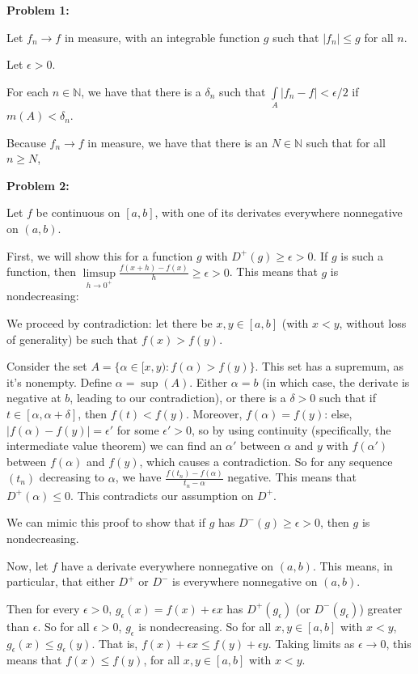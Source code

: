 \documentclass[a4paper,12pt]{article}
\newcommand{\tab}{\hspace{4mm}} %
\newcommand{\shunt}{\vspace{20mm}}
\newcommand{\absval}[1]{\left\lvert #1 \right\rvert}
\newcommand{\al}{\alpha} %
\newcommand{\de}{\delta}
\newcommand{\ep}{\epsilon}
\newcommand{\N}{\mathbb{N}}
\begin{document}
{\bf Problem 1:} 

Let $f_n \to f$ in measure, with an integrable function $g$ such that $\absval{f_n} \leq g$ for all $n$.

Let $\ep>0$.

For each $n \in \N$, we have that there is a $\de_n$ such that $\int\limits_A \absval{f_n - f} < \ep/2$ if $m(A) < \de_n$.

Because $f_n \to f$ in measure, we have that there is an $N \in \N$ such that for all $n \geq N$, %


\shunt

{\bf Problem 2:}

Let $f$ be continuous on $[a,b]$, with one of its derivates everywhere nonnegative on $(a,b)$.

First, we will show this for a function $g$ with $D^+(g) \geq \ep >0$. If $g$ is such a function, then $\limsup\limits_{h \to 0^+} \frac{f(x+h)-f(x)}{h} \geq \ep> 0$. This means that $g$ is nondecreasing:

\tab We proceed by contradiction: let there be $x,y \in [a,b]$ (with $x<y$, without loss of generality) be such that $f(x) > f(y)$.

\tab Consider the set $A = \{\al \in [x,y): f(\al) > f(y)\}$. This set has a supremum, as it's nonempty. Define $\al =\sup(A)$. Either $\al = b$ (in which case, the derivate is negative at $b$, leading to our contradiction), or there is a $\de>0$ such that if $t \in [\al, \al+\de]$, then $f(t) < f(y)$. Moreover, $f(\al) = f(y)$: else, $\absval{f(\al) - f(y)} = \ep'$ for some $\ep' >0$, so by using continuity (specifically, the intermediate value theorem) we can find an $\al'$ between $\al$ and $y$ with $f(\al')$ between $f(\al)$ and $f(y)$, which causes a contradiction. So for any sequence $(t_n)$ decreasing to $\al$, we have $\frac{f(t_n) - f(\al)}{t_n - \al}$ negative. This means that $D^+(\al) \leq 0$. This contradicts our assumption on $D^+$.

We can mimic this proof to show that if $g$ has $D^-(g) \geq \ep >0$, then $g$ is nondecreasing.

Now, let $f$ have a derivate everywhere nonnegative on $(a,b)$. This means, in particular, that either $D^+$ or $D^-$ is everywhere nonnegative on $(a,b)$.

Then for every $\ep>0$, $g_\ep(x) = f(x) + \ep x$ has $D^+(g_\ep)$ (or $D^-(g_\ep)$) greater than $\ep$. So for all $\ep>0$, $g_\ep$ is nondecreasing. So for all $x,y \in [a,b]$ with $x<y$, $g_\ep(x) \leq g_\ep(y)$. That is, $f(x) + \ep x \leq f(y) + \ep y$. Taking limits as $\ep \to 0$, this means that $f(x) \leq f(y)$, for all $x,y \in [a,b]$ with $x<y$.
\end{document}
